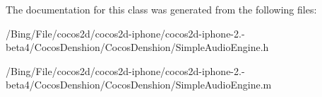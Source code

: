 The documentation for this class was generated from the following files\-:\begin{DoxyCompactItemize}
\item 
/\-Bing/\-File/cocos2d/cocos2d-\/iphone/cocos2d-\/iphone-\/2.-\/beta4/\-Cocos\-Denshion/\-Cocos\-Denshion/Simple\-Audio\-Engine.\-h\item 
/\-Bing/\-File/cocos2d/cocos2d-\/iphone/cocos2d-\/iphone-\/2.-\/beta4/\-Cocos\-Denshion/\-Cocos\-Denshion/Simple\-Audio\-Engine.\-m\end{DoxyCompactItemize}
